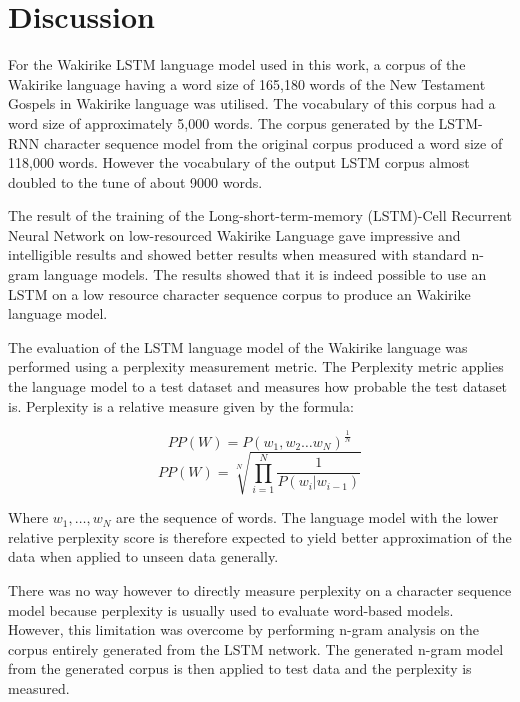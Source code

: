 \documentclass[a4paper]{article}
\begin{document}
\section{Discussion}
For the Wakirike LSTM language model used in this work, a corpus of the Wakirike language having a word size of 165,180 words of the New Testament Gospels in Wakirike language was utilised. The vocabulary of this corpus had a word size of approximately 5,000 words. The corpus generated by the LSTM-RNN character sequence model from the original corpus produced a word size of 118,000 words. However the vocabulary of the output LSTM corpus almost doubled to the tune of about 9000 words. 

The result of the training of the Long-short-term-memory (LSTM)-Cell Recurrent Neural Network on low-resourced Wakirike Language gave impressive and intelligible results and showed better results when measured with standard n-gram language models. The results showed that it is indeed possible to use an LSTM on a low resource character sequence corpus to produce an Wakirike language model.

The evaluation of the LSTM language model of the Wakirike language was performed using a perplexity measurement metric. The Perplexity metric applies the language model to a test dataset and measures how probable the test dataset is. Perplexity is a relative measure given by the formula:

%
\begin{equation}
PP(W)=P(w_1,w_2\dots w_N)^\frac{1}{N}
\label{eq6}
\end{equation}
%
%
\begin{equation}
PP(W)=\sqrt[N]{\prod_{i=1}^N\frac{1}{P(w_i|w_{i-1})}}
\label{eq7}
\end{equation}
%

Where $w_1,\dots,w_N$ are the sequence of words. The language model with the lower relative perplexity score is therefore expected to yield better approximation of the data when applied to unseen data generally.

There was no way however to directly measure perplexity on a character sequence model because perplexity is usually used to evaluate word-based models.  However, this limitation was overcome by performing n-gram analysis on the corpus entirely generated from the LSTM network. The generated n-gram model from the generated corpus is then applied to test data and the perplexity is measured.
\end{document}
